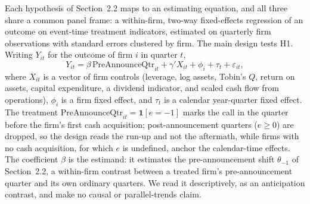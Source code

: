 
Each hypothesis of Section~2.2 maps to an estimating equation, and all three share a common panel frame: a within-firm, two-way fixed-effects regression of an outcome on event-time treatment indicators, estimated on quarterly firm observations with standard errors clustered by firm. The main design tests H1. Writing $Y_{it}$ for the outcome of firm $i$ in quarter $t$,
\begin{equation}
Y_{it} = \beta\,\mathrm{PreAnnounceQtr}_{it} + \gamma' X_{it} + \phi_i + \tau_t + \varepsilon_{it},
\end{equation}
where $X_{it}$ is a vector of firm controls (leverage, log assets, Tobin's $Q$, return on assets, capital expenditure, a dividend indicator, and scaled cash flow from operations), $\phi_i$ is a firm fixed effect, and $\tau_t$ is a calendar year-quarter fixed effect. The treatment $\mathrm{PreAnnounceQtr}_{it}=\mathbf{1}[e=-1]$ marks the call in the quarter before the firm's first cash acquisition; post-announcement quarters ($e\ge 0$) are dropped, so the design reads the run-up and not the aftermath, while firms with no cash acquisition, for which $e$ is undefined, anchor the calendar-time effects. The coefficient $\beta$ is the estimand: it estimates the pre-announcement shift $\theta_{-1}$ of Section~2.2, a within-firm contrast between a treated firm's pre-announcement quarter and its own ordinary quarters. We read it descriptively, as an anticipation contrast, and make no causal or parallel-trends claim.

